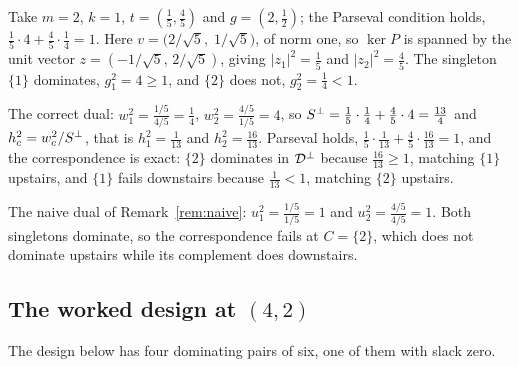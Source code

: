 \begin{example}\label{ex:uneven}
Take $m=2$, $k=1$, $t=(\tfrac15,\tfrac45)$ and $g=(2,\tfrac12)$; the
Parseval condition holds, $\tfrac15\cdot4+\tfrac45\cdot\tfrac14=1$.  Here
$v=\bigl(2/\sqrt5,\;1/\sqrt5\bigr)$, of norm one, so
$\ker P$ is spanned by the unit vector $z=(-1/\sqrt5,\,2/\sqrt5)$, giving
$\lvert z_1\rvert^2=\tfrac15$ and $\lvert z_2\rvert^2=\tfrac45$.  The
singleton $\{1\}$ dominates, $g_1^2=4\ge1$, and $\{2\}$ does not,
$g_2^2=\tfrac14<1$.

The correct dual: $w_1^2=\tfrac{1/5}{4/5}=\tfrac14$,
$w_2^2=\tfrac{4/5}{1/5}=4$, so
$S^{\perp}=\tfrac15\cdot\tfrac14+\tfrac45\cdot4=\tfrac{13}{4}$ and
$h_c^2=w_c^2/S^{\perp}$, that is $h_1^2=\tfrac1{13}$ and $h_2^2=\tfrac{16}{13}$.
Parseval holds, $\tfrac15\cdot\tfrac1{13}+\tfrac45\cdot\tfrac{16}{13}=1$,
and the correspondence is exact: $\{2\}$ dominates in $\mathcal{D}^{\perp}$
because $\tfrac{16}{13}\ge1$, matching $\{1\}$ upstairs, and $\{1\}$
fails downstairs because $\tfrac1{13}<1$, matching $\{2\}$ upstairs.

The naive dual of Remark~\ref{rem:naive}: $u_1^2=\tfrac{1/5}{1/5}=1$ and
$u_2^2=\tfrac{4/5}{4/5}=1$.  Both singletons dominate, so the
correspondence fails at $C=\{2\}$, which does not dominate upstairs while
its complement does downstairs.
\end{example}

\subsection{The worked design at \texorpdfstring{$(4,2)$}{(4,2)}}\label{app:chartworked}

The design below has four dominating pairs of six, one of them with slack
zero.

